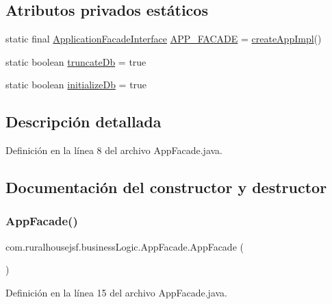 \subsection*{Atributos privados estáticos}
\begin{DoxyCompactItemize}
\item 
static final \mbox{\hyperlink{a00136}{Application\+Facade\+Interface}} \mbox{\hyperlink{a00128_a112b5fb14ea720f893a3c52a26a775c9}{A\+P\+P\+\_\+\+F\+A\+C\+A\+DE}} = \mbox{\hyperlink{a00128_a8f4d396c7d2ce6ba084554d68385fc34}{create\+App\+Impl}}()
\item 
static boolean \mbox{\hyperlink{a00128_ac9cbe77035be5cc1f9bf258c57ca6564}{truncate\+Db}} = true
\item 
static boolean \mbox{\hyperlink{a00128_a08e1f188faabf8bef71610c49bdd5d84}{initialize\+Db}} = true
\end{DoxyCompactItemize}


\subsection{Descripción detallada}


Definición en la línea 8 del archivo App\+Facade.\+java.



\subsection{Documentación del constructor y destructor}
\mbox{\label{a00128_a06c4cf71ecdbda8e7abccdd21d84d549}} 
\subsubsection{\texorpdfstring{AppFacade()}{AppFacade()}}
{\footnotesize\ttfamily com.\+ruralhousejsf.\+business\+Logic.\+App\+Facade.\+App\+Facade (\begin{DoxyParamCaption}{ }\end{DoxyParamCaption})\hspace{0.3cm}{\ttfamily [private]}}



Definición en la línea 15 del archivo App\+Facade.\+java.



